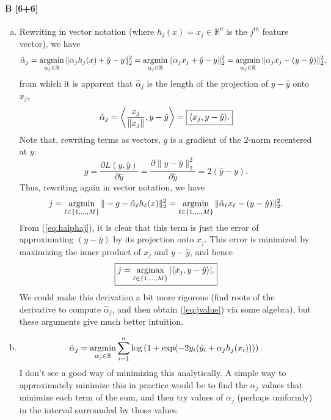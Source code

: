 \documentclass[11pt]{article}
\newcommand{\R}{\mathbb{R}}                             %
\newcommand{\halpha}{\hat{\alpha}}                      %
\newcommand{\hy}{\hat{y}}                               %
\newcommand{\argmin}{\operatornamewithlimits{argmin}}   %
\newcommand{\argmax}{\operatornamewithlimits{argmax}}   %
\begin{document}
\paragraph{B [6+6]}
\begin{enumerate}[(a)]
\item Rewriting in vector notation (where $h_j(x) = x_j \in \R^n$ is the
$j^{th}$ feature vector), we have
\[\halpha_j
    = \argmin_{\alpha_j \in \R} \|\alpha_jh_j(x) + \hy - y\|_2^2
    = \argmin_{\alpha_j \in \R} \|\alpha_jx_j + \hy - y\|_2^2
    = \argmin_{\alpha_j \in \R} \|\alpha_jx_j - (y - \hy)\|_2^2,
\]
from which it is apparent that $\halpha_j$ is the length of the projection of
$y - \hy$ onto $x_j$,
\begin{equation}
\label{eq:halphaj}
\halpha_j
    = \left\langle \frac{x_j}{\|x_j\|}, y - \hy \right\rangle
    = \mbox{\fbox{$\langle x_j, y - \hy \rangle$.}}
\end{equation}
Note that, rewriting terms as vectors, $g$ is a gradient of the $2$-norm
recentered at $y$:
\[g
    = \frac{\partial L(y,\hy)}{\partial \hy}
    = \frac{\partial \|y - \hy\|_2^2}{\partial \hy}
    = 2(\hy - y).
\]
Thus, rewriting again in vector notation, we have
\[
j = \argmin_{\ell \in \{1,\dots,M\}}\|-g - \halpha_\ell h_\ell(x) \|_2^2
  = \argmin_{\ell \in \{1,\dots,M\}}\|\halpha_\ell x_\ell - (y - \hy)\|_2^2.
\]
From (\ref{eq:halphaj}), it is clear that this term is just the error of
approximating $(y - \hy)$ by its projection onto $x_j$. This error is minimized
by maximizing the inner product of $x_j$ and $y - \hy$, and hence
\begin{equation}
\label{eq:jvalue}
 \mbox{\fbox{$\displaystyle
    j = \argmax_{\ell \in \{1,\dots,M\}} |\langle x_j, y - \hy \rangle|.
 $}}
\end{equation}
We could make this derivation a bit more rigorous (find roots of the derivative
to compute $\halpha_j$, and then obtain (\ref{eq:jvalue}) via some algebra),
but these arguments give much better intuition.

\item
\[\halpha_j
    = \argmin_{\alpha_j \in \R} \sum_{i = 1}^n
        \log \left( 1 + \exp(-2y_i(\hy_i + \alpha_jh_j(x_i))) \right).
\]
I don't see a good way of minimizing this analytically. A simple way to
approximately minimize this in practice would be to find the $\alpha_j$ values
that minimize each term of the sum, and then try values of $\alpha_j$ (perhaps
uniformly) in the interval surrounded by those values.
\end{enumerate}
\end{document}
